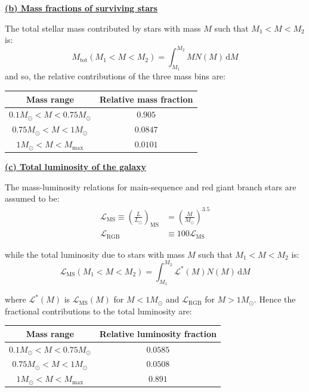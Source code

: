 \documentclass{article}
\begin{document}
\underline{\bf{(b)} Mass fractions of surviving stars}

The total stellar mass contributed by stars with mass $M$ such that $M_1<M<M_2$ is:
\begin{equation}
  M_{\mathrm{tot}}(M_1<M<M_2)=\int_{M_1}^{M_2}MN(M)\,\mathrm{d}M
\end{equation}
\newpage
and so, the relative contributions of the three mass bins are:
\begin{table}[h]
  \centering
  \begin{tabular}{c|c}
    Mass range & Relative mass fraction\\\hline
    $0.1M_\odot<M<0.75M_\odot$ & $0.905$\\
    $0.75M_\odot<M<1M_\odot$ & $0.0847$\\
    $1M_\odot<M<M_{\mathrm{max}}$ & $0.0101$
  \end{tabular}
\end{table}

\underline{\bf{(c)} Total luminosity of the galaxy}

The mass-luminosity relations for main-sequence and red giant branch stars are assumed to be:
\begin{align}
  \mathcal{L}_{\mathrm{MS}}\equiv\left(\frac{L}{L_\odot}\right)_{\mathrm{MS}}&=\left(\frac{M}{M_\odot}\right)^{3.5}\\
  \mathcal{L}_{\mathrm{RGB}}&\equiv 100\mathcal{L}_{\mathrm{MS}}
\end{align}

while the total luminosity due to stars with mass $M$ such that $M_1<M<M_2$ is:
\begin{equation}
  \mathcal{L}_{\mathrm{MS}}(M_1<M<M_2)=\int_{M_1}^{M_2}\mathcal{L^*}(M)N(M)\,\mathrm{d}M
\end{equation}

where $\mathcal{L}^*(M)$ is $\mathcal{L}_{\mathrm{MS}}(M)$ for $M<1M_\odot$ and $\mathcal{L}_{\mathrm{RGB}}$ for $M>1M_\odot$. Hence the fractional contributions to the total luminosity are:
\begin{table}[h]
  \centering
  \begin{tabular}{c|c}
    Mass range & Relative luminosity fraction\\\hline
    $0.1M_\odot<M<0.75M_\odot$ & $0.0585$\\
    $0.75M_\odot<M<1M_\odot$ & $0.0508$\\
    $1M_\odot<M<M_{\mathrm{max}}$ & $0.891$
  \end{tabular}
\end{table}
\end{document}
